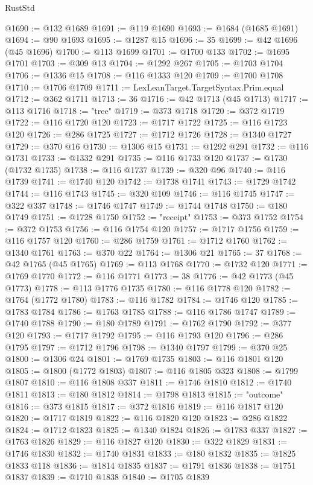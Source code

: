 \begin{lexlean}{RustStd}
\begin{coremodule}
@1690 := @132 @1689
@1691 := @119 @1690
@1693 := @1684 (@1685 @1691)
@1694 := @90 @1693
@1695 := @1287 @15
@1696 := 35
@1699 := @42 @1696 (@45 @1696)
@1700 := @113 @1699
@1701 := @1700 @133
@1702 := @1695 @1701
@1703 := @309 @13
@1704 := @1292 @267
@1705 := @1703 @1704
@1706 := @1336 @15
@1708 := @116 @1333 @120
@1709 := @1700 @1708
@1710 := @1706 @1709
@1711 := LexLeanTarget.TargetSyntax.Prim.equal
@1712 := @362 @1711
@1713 := 36
@1716 := @42 @1713 (@45 @1713)
@1717 := @113 @1716
@1718 := "tree"
@1719 := @373 @1718
@1720 := @372 @1719
@1722 := @116 @1720 @120
@1723 := @1717 @1722
@1725 := @116 @1723 @120
@1726 := @286 @1725
@1727 := @1712 @1726
@1728 := @1340 @1727
@1729 := @370 @16
@1730 := @1306 @15
@1731 := @1292 @291
@1732 := @116 @1731
@1733 := @1332 @291
@1735 := @116 @1733 @120
@1737 := @1730 (@1732 @1735)
@1738 := @116 @1737
@1739 := @320 @96
@1740 := @116 @1739
@1741 := @1740 @120
@1742 := @1738 @1741
@1743 := @1729 @1742
@1744 := @116 @1743
@1745 := @320 @109
@1746 := @116 @1745
@1747 := @322 @337
@1748 := @1746 @1747
@1749 := @1744 @1748
@1750 := @180 @1749
@1751 := @1728 @1750
@1752 := "receipt"
@1753 := @373 @1752
@1754 := @372 @1753
@1756 := @116 @1754 @120
@1757 := @1717 @1756
@1759 := @116 @1757 @120
@1760 := @286 @1759
@1761 := @1712 @1760
@1762 := @1340 @1761
@1763 := @370 @22
@1764 := @1306 @21
@1765 := 37
@1768 := @42 @1765 (@45 @1765)
@1769 := @113 @1768
@1770 := @1732 @120
@1771 := @1769 @1770
@1772 := @116 @1771
@1773 := 38
@1776 := @42 @1773 (@45 @1773)
@1778 := @113 @1776 @1735
@1780 := @116 @1778 @120
@1782 := @1764 (@1772 @1780)
@1783 := @116 @1782
@1784 := @1746 @120
@1785 := @1783 @1784
@1786 := @1763 @1785
@1788 := @116 @1786 @1747
@1789 := @1740 @1788
@1790 := @180 @1789
@1791 := @1762 @1790
@1792 := @377 @120
@1793 := @1717 @1792
@1795 := @116 @1793 @120
@1796 := @286 @1795
@1797 := @1712 @1796
@1798 := @1340 @1797
@1799 := @370 @25
@1800 := @1306 @24
@1801 := @1769 @1735
@1803 := @116 @1801 @120
@1805 := @1800 (@1772 @1803)
@1807 := @116 @1805 @323
@1808 := @1799 @1807
@1810 := @116 @1808 @337
@1811 := @1746 @1810
@1812 := @1740 @1811
@1813 := @180 @1812
@1814 := @1798 @1813
@1815 := "outcome"
@1816 := @373 @1815
@1817 := @372 @1816
@1819 := @116 @1817 @120
@1820 := @1717 @1819
@1822 := @116 @1820 @120
@1823 := @286 @1822
@1824 := @1712 @1823
@1825 := @1340 @1824
@1826 := @1783 @337
@1827 := @1763 @1826
@1829 := @116 @1827 @120
@1830 := @322 @1829
@1831 := @1746 @1830
@1832 := @1740 @1831
@1833 := @180 @1832
@1835 := @1825 @1833 @118
@1836 := @1814 @1835
@1837 := @1791 @1836
@1838 := @1751 @1837
@1839 := @1710 @1838
@1840 := @1705 @1839

\end{coremodule}
\end{lexlean}
